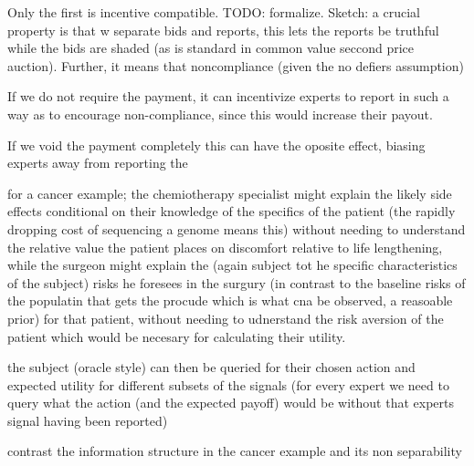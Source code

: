 Only the first is incentive compatible. TODO: formalize. Sketch: a crucial property is that w separate bids and reports, this lets the reports be truthful while the bids are shaded (as is standard in common value seccond price auction). Further, it means that noncompliance (given the no defiers assumption) 


If we do not require the payment, it can incentivize experts to report in such a way as to encourage non-compliance, since this would increase their payout. 


If we void the payment completely this can have the oposite effect, biasing experts away from reporting the 


for a cancer example; the chemiotherapy specialist might explain the likely side effects conditional on their knowledge of the specifics of the patient (the rapidly dropping cost of sequencing a genome means this) without needing to understand the relative value the patient places on discomfort relative to life lengthening, while the surgeon might explain the (again subject tot he specific characteristics of the subject) risks he foresees in the surgury (in contrast to the baseline risks of the populatin that gets the procude which is what cna be observed, a reasoable prior) for that patient, without needing to udnerstand the risk aversion of the patient which would be necesary for calculating their utility.

the subject (oracle style) can then be queried for their chosen action and expected utility for different subsets of the signals (for every expert we need to query what the action (and the expected payoff) would be without that experts signal having been reported)

contrast the information structure in the cancer example and its non separability 


